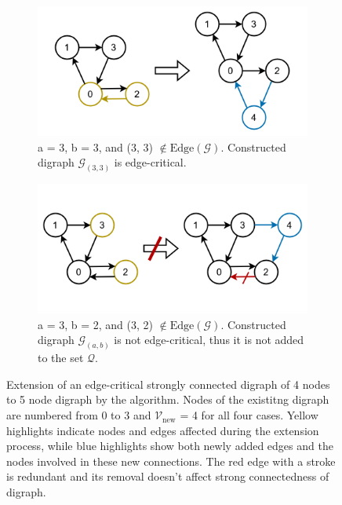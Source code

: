 \documentclass[runningheads]{llncs}
\begin{document}
\begin{figure}[htbp]
    \begin{subfigure}{0.48\textwidth}
        \centering
        \includegraphics[width=\textwidth]{fig1_c.png}
        \caption{a = 3, b = 3, and (3, 3) $\notin \text{Edge}(\mathcal{G})$. Constructed digraph $\mathcal{G}_{(3, 3)}$ is edge-critical.}
        \label{fig:1c}
    \end{subfigure}
    \hfill
    \begin{subfigure}{0.48\textwidth}
        \centering
        \includegraphics[width=\textwidth]{fig1_d.png}
        \caption{a = 3, b = 2, and (3, 2) $\notin \text{Edge}(\mathcal{G})$. Constructed digraph $\mathcal{G}_{(a, b)}$ is not edge-critical, thus it is not added to the set $\mathcal{Q}$.}
        \label{fig:1d}
    \end{subfigure}
    \caption{Extension of an edge-critical strongly connected digraph of 4 nodes to 5 node digraph by the algorithm. Nodes of the existitng digraph are numbered from 0 to 3 and $\mathcal{V}_{\text{new}}$ = 4 for all four cases. Yellow highlights indicate nodes and edges affected during the extension process, while blue highlights show both newly added edges and the nodes involved in these new connections. The red edge with a stroke is redundant and its removal doesn't affect strong connectedness of digraph.}
    \label{fig:complete}
\end{figure}
\end{document}
